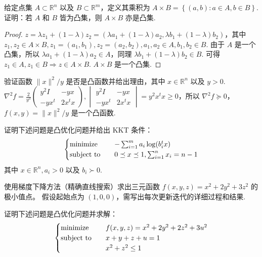 \begin{problem}[问答]
    给定点集 $A\subset \mathbb{R}^n$ 以及 $B \subset \mathbb{R}^m$，定义其乘积为 $A \times B = \left\{(a, b): a \in A, b \in B\right\}$.证明：若 $A$ 和 $B$ 皆为凸集，则 $A \times B$ 亦是凸集.
    \begin{proof}
        $z = \lambda z_1 + (1 - \lambda)z_2 = (\lambda a_1 + (1 - \lambda)a_2, \lambda b_1 + (1 - \lambda)b_2)$，其中 $z_1, z_2 \in A \times B, z_1 = (a_1, b_1), z_2 = (a_2, b_2), a_1, a_2 \in A, b_1, b_2 \in B$. 由于 $A$ 是一个凸集，所以 $\lambda a_1 + (1 - \lambda)a_2 \in A$，同理 $\lambda b_1 + (1 - \lambda)b_2 \in B$. 可得 $z_1 \in A, z_1 \in B \Longrightarrow z \in A\times B$. $A \times B$ 是一个凸集.
    \end{proof}
\end{problem}

\begin{problem}[问答]
    验证函数 $\|x\|^2 / y$ 是否是凸函数并给出理由，其中 $x \in \mathbb{R}^n$ 以及 $y > 0$.
    \Answer $\nabla^2f = \frac{2}{y^3}\begin{pmatrix}
        y^2I & -yx \\
        -yx^t & 2x^tx
    \end{pmatrix}, \begin{vmatrix}
        y^2I & -yx \\
        -yx^t & 2x^tx
    \end{vmatrix} = y^2x^tx \ge 0$，所以 $\nabla^2f \succeq 0$，$f(x, y) = \|x\|^2 / y$ 是一个凸函数. 
\end{problem}

\begin{problem}[问答]
    证明下述问题是凸优化问题并给出 KKT 条件：\[\begin{cases}
        \operatorname{minimize} \quad &-\sum_{i = 1}^m a_i\log(b_i^tx)\\
        \operatorname{subject\ to} \quad &0 \preceq x \preceq 1, \sum_{i = 1}^nx_i = n - 1
    \end{cases}\] 其中 $x\in \mathbb{R}^n, a_i > 0$ 以及 $b_i \succ 0$.
    \Answer 
\end{problem}

\begin{problem}[问答]
    使用梯度下降方法（精确直线搜索）求出三元函数 $f(x, y, z) = x^2 + 2y^2 + 3z^2$ 的极小值点。 假设起始点为 $(1, 0, 0)$，需写出每次更新迭代的详细过程和结果.
    \Answer 
\end{problem}

\begin{problem}[问答]
    证明下述问题是凸优化问题并求解：\[\begin{cases}
        \operatorname{minimize} \quad &f(x, y, z) = x^2 + 2y^2 + 2z^2 + 3u^2\\
        \operatorname{subject\ to} \quad &x + y + z + u = 1\\
        &x^2 + z^2 \le 1 
    \end{cases}\]
    \Answer 
\end{problem}

